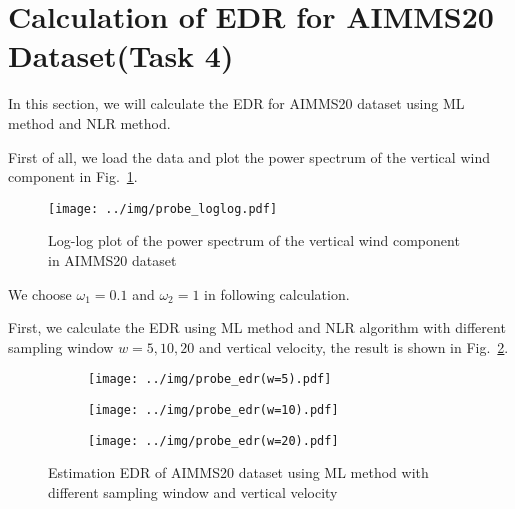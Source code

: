 \documentclass[runningheads]{llncs}
\begin{document}
\section{Calculation of EDR for AIMMS20 Dataset(Task 4)}

In this section, we will calculate the EDR for AIMMS20 dataset using ML method and NLR method.

First of all, we load the data and plot the power spectrum of the vertical wind component in Fig.~\ref{fig:4}.

\begin{figure}
    \centering
    \texttt{[image: ../img/probe\_loglog.pdf]}
    \caption{Log-log plot of the power spectrum of the vertical wind component in AIMMS20 dataset}
    \label{fig:4}
\end{figure}

We choose $\omega_1=0.1$ and $\omega_2=1$ in following calculation.

First, we calculate the EDR using ML method and NLR algorithm with different sampling window $w=5,10,20$ and vertical velocity, the result is shown in Fig.~\ref{fig:6}.

\begin{figure}
    \centering
    \begin{subfigure}{.4\textwidth}
        \centering
        \texttt{[image: ../img/probe\_edr(w=5).pdf]}
    \end{subfigure}
    \begin{subfigure}{.4\textwidth}
        \centering
        \texttt{[image: ../img/probe\_edr(w=10).pdf]}
    \end{subfigure}
    \begin{subfigure}{.4\textwidth}
        \centering
        \texttt{[image: ../img/probe\_edr(w=20).pdf]}
    \end{subfigure}
    \caption{Estimation EDR of AIMMS20 dataset using ML method with different sampling window and vertical velocity}
    \label{fig:6}
\end{figure}



\end{document}

